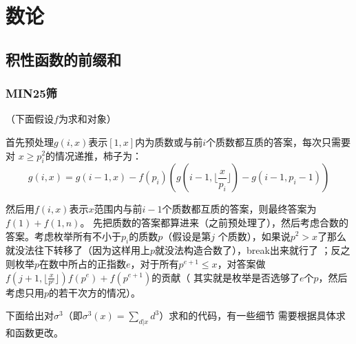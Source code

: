 \chapter{数论}

\section{积性函数的前缀和}
\subsection{MIN25筛}
（下面假设$f$为求和对象）\par
首先预处理$g(i, x)$表示$[1, x]$内为质数或与前$i$个质数都互质的答案，每次只需要对
$x\geq p_i^2$的情况递推，柿子为：
\[g(i, x) = g(i - 1, x) - f(p_i)(g(i - 1,\lfloor\frac{x}{p_i}\rfloor) - g(i - 1, p_i - 1))\]\par
然后用$f(i, x)$表示$x$范围内与前$i-1$个质数都互质的答案，则最终答案为$f(1)+f(1, n)$。
先把质数的答案都算进来（之前预处理了），然后考虑合数的答案。考虑枚举所有不小于$p_i$的质数$p$（假设是第$j$
个质数），如果说$p^2>x$了那么就没法往下转移了（因为这样用上$p$就没法构造合数了），break出来就行了
；反之则枚举$p$在数中所占的正指数$e$，对于所有$p^{e+1}\leq x$，对答案做
$f(j + 1, \lfloor\frac{x}{p^e}\rfloor)f(p^e) + f(p^{e + 1})$的贡献（
其实就是枚举是否选够了$e$个$p$，然后考虑只用$p$的若干次方的情况）。\par
下面给出对$\sigma^3$（即$\sigma^3(x) = \sum_{d | x}d^3$）求和的代码，有一些细节
需要根据具体求和函数更改。
